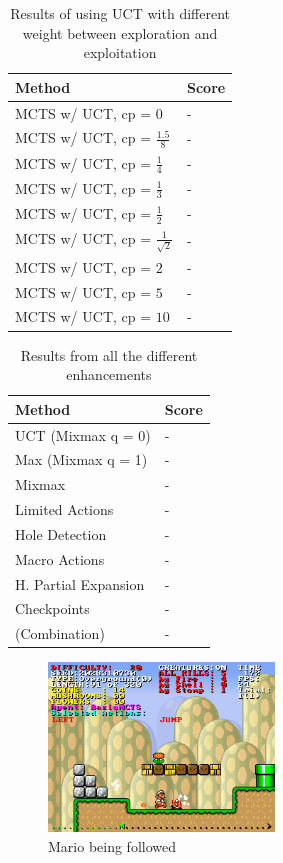 \documentclass[10pt,a4paper]{article}
\begin{document}
\begin{table}[h]
	\centering
	\begin{tabular}{| l | l |}
		\hline
		\textbf{Method} & \textbf{Score} \\ \hline
		MCTS w/ UCT, cp = 0			 			& - \\ \hline
		MCTS w/ UCT, cp = $\frac{1.5}{8}$		& - \\ \hline
		MCTS w/ UCT, cp = $\frac{1}{4}$		 	& - \\ \hline
		MCTS w/ UCT, cp = $\frac{1}{3}$		 	& - \\ \hline
		MCTS w/ UCT, cp = $\frac{1}{2}$		 	& - \\ \hline
		MCTS w/ UCT, cp = $\frac{1}{\sqrt{2}}$	& - \\ \hline
		MCTS w/ UCT, cp = $2$			 		& - \\ \hline
		MCTS w/ UCT, cp = $5$			 		& - \\ \hline
		MCTS w/ UCT, cp = $10$		 			& - \\ \hline
	\end{tabular}
	\caption{Results of using UCT with different weight between exploration and exploitation}
	\label{tab:uct_cp_results}
\end{table}

\begin{table}[h]
	\centering
	\begin{tabular}{| l | l |}
		\hline
		\textbf{Method} & \textbf{Score} \\ \hline
		UCT (Mixmax q = 0)				& - \\ \hline
		Max (Mixmax q = 1)				& - \\ \hline
		Mixmax							& - \\ \hline
		Limited Actions		 			& - \\ \hline
		Hole Detection		 			& - \\ \hline
		Macro Actions		 			& - \\ \hline
		H. Partial Expansion			& - \\ \hline
		Checkpoints						& - \\ \hline
		(Combination)					& - \\ \hline
	\end{tabular}
	\caption{Results from all the different enhancements}
	\label{tab:method_results}
\end{table}


\begin{figure}[h]
\centering
\includegraphics[width=6cm]{Forfulgt.png}
\caption{Mario being followed}
\label{fig:followed}
\end{figure}
\end{document}
